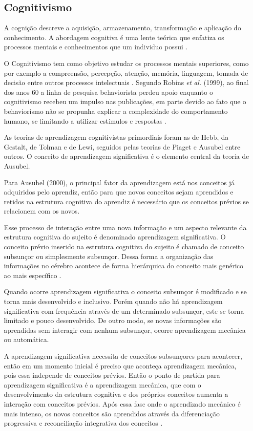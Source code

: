 \subsection{Cognitivismo}

A cognição descreve a aquisição, armazenamento, transformação e aplicação do conhecimento. A abordagem cognitiva é uma lente teórica que enfatiza os processos mentais e conhecimentos que um individuo possui \cite{matlin2004}.

O Cognitivismo tem como objetivo estudar os processos mentais superiores, como por exemplo a compreensão, percepção, atenção, memória, linguagem, tomada de decisão entre outros processos intelectuais \cite{moreira1999}.
Segundo Robins \textit{et al.} (1999), ao final dos anos 60 a linha de pesquisa behaviorista perdeu apoio enquanto o cognitivismo recebeu um impulso nas publicações, em parte devido ao fato que o behaviorismo não  se propunha explicar a complexidade do comportamento humano, se limitando a utilizar estímulos e respostas \cite{robins1999, fragelli2010}.

As teorias de aprendizagem cognitivistas primordiais foram as de Hebb, da Gestalt, de Tolman e de Lewi, seguidos pelas teorias de Piaget e Ausubel entre outros. O conceito de aprendizagem significativa é o elemento central da teoria de Ausubel.

Para Ausubel (2000), o principal fator da aprendizagem está nos conceitos já adquiridos pelo aprendiz, então para que novos conceitos sejam aprendidos e retidos na estrutura cognitiva do aprendiz é necessário que os conceitos prévios se relacionem com os novos.

Esse processo de interação entre uma nova informação e um aspecto relevante da estrutura cognitiva do sujeito é denominado aprendizagem significativa. O conceito prévio inserido na estrutura cognitiva do sujeito é chamado de conceito subsunçor ou simplesmente subsunçor. Dessa forma a organização das informações no cérebro acontece de forma hierárquica do conceito mais genérico ao mais específico \cite{ausubel2000}.

Quando ocorre aprendizagem significativa o conceito subsunçor é modificado e se torna mais desenvolvido e inclusivo. Porém quando não há aprendizagem significativa com frequência através de um determinado subsunçor, este se torna limitado e pouco desenvolvido. De outro modo, se novas informações são aprendidas sem interagir com nenhum subsunçor, ocorre aprendizagem mecânica ou automática.

A aprendizagem significativa necessita de conceitos subsunçores para acontecer, então em um momento inicial é preciso que aconteça aprendizagem mecânica, pois essa independe de conceitos prévios. Então o ponto de partida para aprendizagem significativa é a aprendizagem mecânica, que com o desenvolvimento da estrutura cognitiva e dos próprios conceitos aumenta a interação com conceitos prévios. Após essa fase onde o aprendizado mecânico é mais intenso, os novos conceitos são aprendidos através da diferenciação progressiva e reconciliação integrativa dos conceitos \cite{ausubel2000, fragelli2010}.

